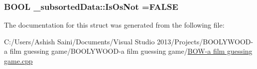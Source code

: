 \subsubsection[{Is\+Os\+Not}]{\setlength{\rightskip}{0pt plus 5cm}B\+O\+O\+L \+\_\+subsorted\+Data\+::\+Is\+Os\+Not =F\+A\+L\+S\+E}\label{struct__subsorted_data_a0862da3adfbf1c8f7c5fb7fb746f2616}


The documentation for this struct was generated from the following file\+:\begin{DoxyCompactItemize}
\item 
C\+:/\+Users/\+Ashish Saini/\+Documents/\+Visual Studio 2013/\+Projects/\+B\+O\+O\+L\+Y\+W\+O\+O\+D-\/a film guessing game/\+B\+O\+O\+L\+Y\+W\+O\+O\+D-\/a film guessing game/\hyperlink{_b_o_w-a_01film_01guessing_01game_8cpp}{B\+O\+W-\/a film guessing game.\+cpp}\end{DoxyCompactItemize}
